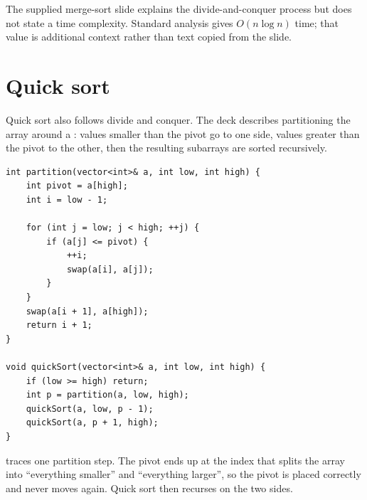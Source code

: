 \begin{clarification}
The supplied merge-sort slide explains the divide-and-conquer process but does not state a time complexity. Standard analysis gives $O(n\log n)$ time; that value is additional context rather than text copied from the slide.
\end{clarification}

\section{Quick sort}

Quick sort also follows divide and conquer. The deck describes partitioning the array around a : values smaller than the pivot go to one side, values greater than the pivot to the other, then the resulting subarrays are sorted recursively.

\begin{lstlisting}
int partition(vector<int>& a, int low, int high) {
    int pivot = a[high];
    int i = low - 1;

    for (int j = low; j < high; ++j) {
        if (a[j] <= pivot) {
            ++i;
            swap(a[i], a[j]);
        }
    }
    swap(a[i + 1], a[high]);
    return i + 1;
}

void quickSort(vector<int>& a, int low, int high) {
    if (low >= high) return;
    int p = partition(a, low, high);
    quickSort(a, low, p - 1);
    quickSort(a, p + 1, high);
}
\end{lstlisting}

 traces one partition step. The pivot ends up at the index that
splits the array into ``everything smaller'' and ``everything larger'', so the pivot is
placed correctly and never moves again. Quick sort then recurses on the two sides.

